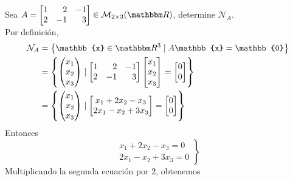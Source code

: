 \begin{example}
    Sea $A = \begin{bmatrix*}[r]
        1 & 2 & -1 \\
        2 & -1 & 3
    \end{bmatrix*} \in \mathcal{M}_{2 \times 3}(\RR)$, determine $\mathcal{N}_A$. \\
    \solucion Por definición,
    \begin{align*}
        \mathcal{N}_A & = \left\{ \mathbb{x} \in \RR[3] \mid A\mathbb{x} = \mathbb{0} \right\} \\
        & = \left\{ \begin{pmatrix}
            x_1 \\
            x_2 \\
            x_3
        \end{pmatrix} \mid \begin{bmatrix*}[r]
            1 & 2 & -1 \\
            2 & -1 & 3
        \end{bmatrix*} \begin{bmatrix}
            x_1 \\
            x_2 \\
            x_3
        \end{bmatrix} = \begin{bmatrix}
            0 \\
            0
        \end{bmatrix} \right\} \\
        & = \left\{ \begin{pmatrix}
            x_1 \\
            x_2 \\
            x_3
        \end{pmatrix} \mid \begin{bmatrix}
            x_1 + 2x_2 - x_3 \\
            2x_1 - x_2 + 3x_3
        \end{bmatrix} = \begin{bmatrix}
            0 \\
            0
        \end{bmatrix} \right\}
    \end{align*}
    Entonces
    $$\left. \begin{array}{r}
        x_1 + 2x_2 - x_3 = 0\\
        2x_1 - x_2 + 3x_3 = 0
    \end{array} \right\}$$
    Multiplicando la segunda ecuación por $2$, obtenemos

\end{example}
